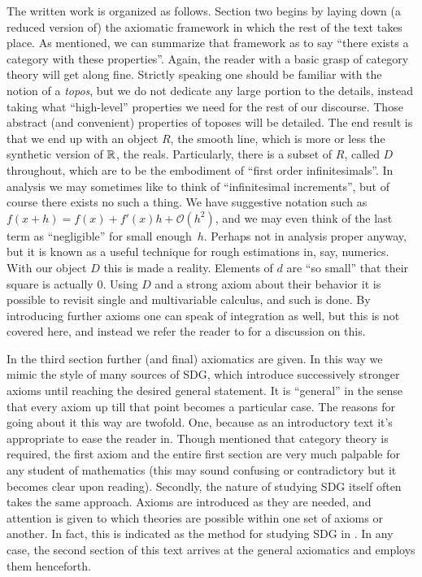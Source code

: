 The written work is organized as follows. Section two begins by laying down (a reduced version of) the axiomatic framework in which the rest of the text takes place. As mentioned, we can summarize that framework as to say ``there exists a category with these properties''. Again, the reader with a basic grasp of category theory will get along fine. Strictly speaking one should be familiar with the notion of a \emph{topos}, but we do not dedicate any large portion to the details, instead taking what ``high-level'' properties we need for the rest of our discourse. Those abstract (and convenient) properties of toposes will be detailed. The end result is that we end up with an object \( R \), the smooth line, which is more or less the synthetic version of \( \mathbb{R} \), the reals. Particularly, there is a subset of \( R \), called \( D \) throughout, which are to be the embodiment of ``first order infinitesimals''. In analysis we may sometimes like to think of ``infinitesimal increments'', but of course there exists no such a thing. We have suggestive notation such as \( f(x+h) = f(x) + f'(x)h + \mathcal O(h^2) \), and we may even think of the last term as ``negligible'' for small enough~\( h \). Perhaps not in analysis proper anyway, but it is known as a useful technique for rough estimations in, say, numerics. With our object \( D \) this is made a reality. Elements of \( d \) are ``so small'' that their square is actually \( 0 \). Using \( D \) and a strong axiom about their behavior it is possible to revisit single and multivariable calculus, and such is done. By introducing further axioms one can speak of integration as well, but this is not covered here, and instead we refer the reader to \cite{lav96} for a discussion on this.

In the third section further (and final) axiomatics are given. In this way we mimic the style of many sources of SDG, which introduce successively stronger axioms until reaching the desired general statement. It is ``general'' in the sense that every axiom up till that point becomes a particular case. The reasons for going about it this way are twofold. One, because as an introductory text it's appropriate to ease the reader in. Though mentioned that category theory is required, the first axiom and the entire first section are very much palpable for any student of mathematics (this may sound confusing or contradictory but it becomes clear upon reading). Secondly, the nature of studying SDG itself often takes the same approach. Axioms are introduced as they are needed, and attention is given to which theories are possible within one set of axioms or another. In fact, this is indicated as the method for studying SDG in \cite{bun17}. In any case, the second section of this text arrives at the general axiomatics and employs them henceforth.

